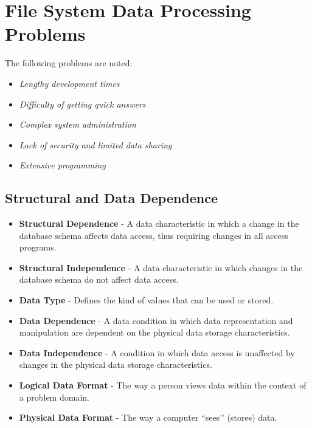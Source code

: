 \documentclass[a4paper, 12pt, titlepage]{report}
\begin{document}
\section{File System Data Processing Problems}
The following problems are noted:
\begin{itemize}
\item \emph{Lengthy development times}
\item \emph{Difficulty of getting quick answers}
\item \emph{Complex system administration}
\item \emph{Lack of security and limited data sharing}
\item \emph{Extensive programming}
\end{itemize}
\subsection{Structural and Data Dependence}
\begin{itemize}
\item \textbf{Structural Dependence} - A data characteristic in which a change in the database schema affects data access, thus requiring changes in all access programs. 
\item \textbf{Structural Independence} - A data characteristic in which changes in the database schema do not affect data access.
\item \textbf{Data Type} - Defines the kind of values that can be used or stored.
\item \textbf{Data Dependence} - A data condition in which data representation and manipulation are dependent on the physical data storage characteristics.
\item \textbf{Data Independence} - A condition in which data access is unaffected by changes in the physical data storage characteristics. 
\item \textbf{Logical Data Format} - The way a person views data within the context of a problem domain.
\item \textbf{Physical Data Format} - The way a computer ``sees’’ (stores) data.
\end{itemize}
\end{document}
